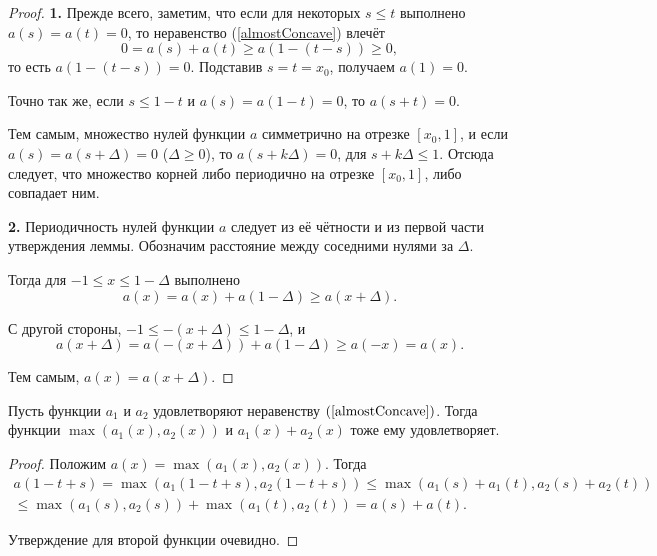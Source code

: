 \begin{proof}
\textbf{1.}
Прежде всего, заметим, что если для некоторых $s \le t$ выполнено $a(s) = a(t) = 0$,
то неравенство (\ref{almostConcave}) влечёт
$$
0 = a(s) + a(t) \ge a(1 - (t - s)) \ge 0,
$$
то есть $a(1 - (t - s)) = 0$.
Подставив $s = t = x_0$, получаем $a(1) = 0$.

Точно так же, если $s \le 1 - t$ и $a(s) = a(1 - t) = 0$, то $a(s + t) = 0$.

Тем самым, множество нулей функции $a$ симметрично на отрезке $[x_0, 1]$,
и если $a(s) = a(s + \Delta) = 0$ ($\Delta \ge 0$),
то $a(s + k\Delta) = 0$, для $s + k\Delta \le 1$.
Отсюда следует, что множество корней либо периодично на отрезке $[x_0, 1]$, либо совпадает ним.

\textbf{2.}
Периодичность нулей функции $a$ следует из её чётности и из первой части утверждения леммы.
Обозначим расстояние между соседними нулями за $\Delta$.

Тогда для $-1 \le x \le 1 - \Delta$ выполнено
$$
a(x) = a(x) + a(1 - \Delta) \ge a(x + \Delta).
$$

С другой стороны, $-1 \le -(x + \Delta) \le 1 - \Delta$, и
$$
a(x + \Delta) = a(-(x + \Delta)) + a(1 - \Delta) \ge a(-x) = a(x).
$$

Тем самым, $a(x) = a(x + \Delta)$.
\end{proof}

\begin{lm}
\label{maxSumConcave}
Пусть функции $a_1$ и $a_2$ удовлетворяют неравенству $(\ref{almostConcave})$.
Тогда функции $\max (a_1(x), a_2(x))$ и $a_1(x) + a_2(x)$ тоже ему удовлетворяет.
\end{lm}
\begin{proof}
Положим $a(x) = \max (a_1(x), a_2(x))$.
Тогда
\begin{multline*}
a(1 - t + s) = \max(a_1( 1 - t + s), a_2(1 - t + s)) \le
\max(a_1(s) + a_1(t), a_2(s) + a_2(t)) \\
\le \max(a_1(s), a_2(s)) + \max(a_1(t), a_2(t)) =
a(s) + a(t).
\end{multline*}

Утверждение для второй функции очевидно.
\end{proof}

